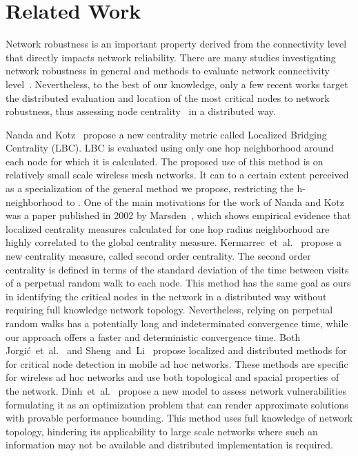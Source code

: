 \documentclass[conference,fleqn]{IEEEtran}
\begin{document}
\section{Related Work}
\label{sec:RelW}

Network robustness is an important property derived from the connectivity level
that directly impacts network reliability. There are many studies investigating
network robustness in general and methods to evaluate network connectivity level~\cite{Albert2000a,Newman2000,Kim2004}.
Nevertheless, to the best of our knowledge, only a few recent works target the distributed evaluation and location of the most critical nodes to network robustness, thus assessing node centrality~\cite{Nanda2008,Kermarrec2011,Dinh2010} in a distributed way.

Nanda and Kotz~\cite{Nanda2008} propose a new centrality metric called 
Localized Bridging Centrality (LBC). LBC is evaluated using only one hop neighborhood around 
each node for which it is calculated. The proposed use of this method is on relatively small scale wireless mesh networks. It can 
to a certain extent perceived as a specialization of the general method we propose, restricting the h-neighborhood to .
One of the main motivations for the work of Nanda and Kotz 
was a paper published in 2002 by Marsden~\cite{Marsden2002}, which shows empirical evidence 
that localized centrality measures calculated for one hop radius neighborhood are highly correlated to the global centrality measure.  
Kermarrec~et~al.~\cite{Kermarrec2011} propose a new centrality measure, called second order centrality.
The second order centrality is defined in terms of the standard deviation of the time between visits of a perpetual random walk to each node.
This method has the same goal as ours in identifying the critical nodes in the network in a distributed way without requiring full knowledge 
network topology. Nevertheless, relying on perpetual random walks has a potentially long and indeterminated convergence 
time, while our approach offers a faster and deterministic convergence time.
Both Jorgi\'{c}~et~al.~\cite{Jorgic2004} and Sheng~and~Li~\cite{Sheng2006} propose localized and distributed methods for for critical 
node detection in mobile ad hoc networks. These methods are specific for wireless ad hoc networks and use both topological and
spacial properties of the network.
Dinh~et~al.~\cite{Dinh2010} propose a new model to assess network vulnerabilities formulating it as an optimization problem
that can render approximate solutions with provable performance bounding. This method uses full knowledge of network topology, hindering its
applicability to large scale networks where such an information may not be available and distributed implementation is required.
\end{document}
